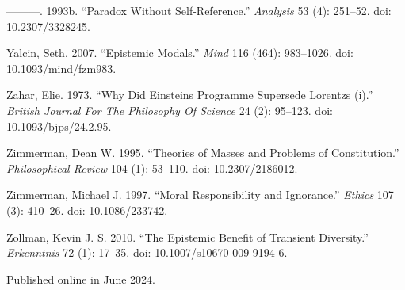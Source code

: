 \documentclass[
  10pt,
  letterpaper,
  DIV=11,
  numbers=noendperiod,
  twoside]{scrartcl}
\newlength{\cslhangindent}
\newenvironment{CSLReferences}[2] %
 {\begin{list}{}{%
  \setlength{\itemindent}{0pt}
  \setlength{\leftmargin}{0pt}
  \setlength{\parsep}{0pt}
  \ifodd #1
   \setlength{\leftmargin}{\cslhangindent}
   \setlength{\itemindent}{-1\cslhangindent}
  \fi
  \setlength{\itemsep}{#2\baselineskip}}}
 {\end{list}}
\begin{document}
\begin{CSLReferences}{1}{0}
---------. 1993b. {``Paradox Without Self-Reference.''} \emph{Analysis}
53 (4): 251--52. doi:
\href{https://doi.org/10.2307/3328245}{10.2307/3328245}.

Yalcin, Seth. 2007. {``Epistemic Modals.''} \emph{Mind} 116 (464):
983--1026. doi:
\href{https://doi.org/10.1093/mind/fzm983}{10.1093/mind/fzm983}.

Zahar, Elie. 1973. {``Why Did Einsteins Programme Supersede Lorentzs
(i).''} \emph{British Journal For The Philosophy Of Science} 24 (2):
95--123. doi:
\href{https://doi.org/10.1093/bjps/24.2.95}{10.1093/bjps/24.2.95}.

Zimmerman, Dean W. 1995. {``Theories of Masses and Problems of
Constitution.''} \emph{Philosophical Review} 104 (1): 53--110. doi:
\href{https://doi.org/10.2307/2186012}{10.2307/2186012}.

Zimmerman, Michael J. 1997. {``Moral Responsibility and Ignorance.''}
\emph{Ethics} 107 (3): 410--26. doi:
\href{https://doi.org/10.1086/233742}{10.1086/233742}.

Zollman, Kevin J. S. 2010. {``The Epistemic Benefit of Transient
Diversity.''} \emph{Erkenntnis} 72 (1): 17--35. doi:
\href{https://doi.org/10.1007/s10670-009-9194-6}{10.1007/s10670-009-9194-6}.

\end{CSLReferences}



\noindent Published online in June 2024.
\end{document}
